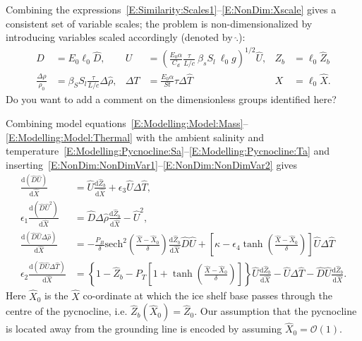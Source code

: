 \documentclass[openacc]{rsproca_new}%
\newcommand{\dd}[2]{\frac{\mathrm{d} #1}{\mathrm{d} #2}}
\newcommand{\order}[1]{\mathcal{O}(#1)}
\newcommand{\red}[1]{{\color{red} #1}}
\newcommand{\epsone}{\epsilon_{1}} %
\newcommand{\epstwo}{\epsilon_{2}} %
\newcommand{\epsthree}{\epsilon_{3}} %
\newcommand{\epsfour}{\epsilon_{4}}
\newcommand{\Pb}{\textit{P}_B}  %
\newcommand{\lt}{\delta} %
\newcommand{\Pt}{\textit{P}_T}
\begin{document}
Combining the expressions~\eqref{E:Similarity:Scales1}--\eqref{E:NonDim:Xscale} gives a consistent set of variable scales; the problem is non-dimensionalized by introducing variables scaled accordingly (denoted by  $\hat{.}$):
\begin{align}
D&= E_0 \ell_0 \hat{D}, & U&= \left(\frac{E_0 \alpha}{C_d} \frac{\tau}{L/c}~\beta_s S_l ~\ell_0  g\right)^{1/2}\hat{U}, & Z_b &= \ell_0 \hat{Z}_b\label{E:NonDim:NonDimVar1}\\
\frac{\Delta \rho}{\rho_0} &= \beta_S S_l \frac{\tau}{L/c}\Delta \hat{\rho}, & \Delta T &= \frac{E_0 \alpha}{St}\tau \Delta \hat{T} & X &=\ell_0\hat{X}. \label{E:NonDim:NonDimVar2}
\end{align}
\red{Do you want to add a comment on the dimensionless groups identified here?}


Combining model equations~\eqref{E:Modelling:Model:Mass}--\eqref{E:Modelling:Model:Thermal} with the ambient salinity and temperature~\eqref{E:Modelling:Pycnocline:Sa}--\eqref{E:Modelling:Pycnocline:Ta} and inserting~\eqref{E:NonDim:NonDimVar1}--\eqref{E:NonDim:NonDimVar2} gives
\begin{align}
\dd{(\hat{D}\hat{U})}{\hat{X}} &= \hat{U} \dd{\hat{Z}_b}{\hat{X}} +\epsthree \hat{U} \Delta \hat{T},\label{E:NonDim:mass}\\
\epsone \dd{(\hat{D}\hat{U}^2)}{\hat{X}} &= \hat{D} \Delta \hat{\rho} \dd{\hat{Z}_b}{\hat{X}} - \hat{U}^2,\label{E:NonDim:mom} \\
\dd{(\hat{D}\hat{U}\Delta \hat{\rho})}{\hat{X}}  &= -\frac{\Pb}{\delta} \mathrm{sech}^2\left(\frac{\hat{X} - \hat{X}_0}{\lt}\right)\dd{\hat{Z}_b}{\hat{X}} \hat{D}\hat{U}+
 \left[\kappa - \epsfour \tanh \left(\frac{\hat{X} - \hat{X}_0}{\lt}\right) \right] \hat{U} \Delta \hat{T}\label{E:NonDim:buoyancy} \\
\epstwo \dd{(\hat{D}\hat{U}\Delta \hat{T})}{\hat{X}} &= \left\{1 - \hat{Z}_b - \Pt\left[1 + \tanh\left(\frac{\hat{X} - \hat{X}_0}{\lt}\right)\right]\right\} \hat{U}\dd{\hat{Z}_b}{\hat{X}}  - \hat{U}\Delta \hat{T}- \hat{D}\hat{U}\dd{\hat{Z}_b}{\hat{X}}.\label{E:NonDim:thermal}
 \end{align}
Here $\hat{X}_0$ is the $\hat{X}$ co-ordinate at which the ice shelf base passes through the centre of the pycnocline, i.e. $\hat{Z}_b(\hat{X}_0) = \hat{Z}_0$. Our assumption that the pycnocline is located away from the grounding line is encoded by assuming $\hat{X}_0 = \order{1}$.
\end{document}
